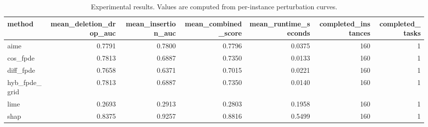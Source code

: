 \begin{table}[t]
\caption{Experimental results. Values are computed from per-instance perturbation curves.}
\label{tab:main_results_computed}
\centering
\begin{tabular}{lrrrrrr}
\toprule
method & mean\_deletion\_drop\_auc & mean\_insertion\_auc & mean\_combined\_score & mean\_runtime\_seconds & completed\_instances & completed\_tasks \\
\midrule
aime & 0.7791 & 0.7800 & 0.7796 & 0.0375 & 160 & 1 \\
cos\_fpde & 0.7813 & 0.6887 & 0.7350 & 0.0133 & 160 & 1 \\
diff\_fpde & 0.7658 & 0.6371 & 0.7015 & 0.0221 & 160 & 1 \\
hyb\_fpde\_grid & 0.7813 & 0.6887 & 0.7350 & 0.0140 & 160 & 1 \\
lime & 0.2693 & 0.2913 & 0.2803 & 0.1958 & 160 & 1 \\
shap & 0.8375 & 0.9257 & 0.8816 & 0.5499 & 160 & 1 \\
\bottomrule
\end{tabular}

\end{table}
